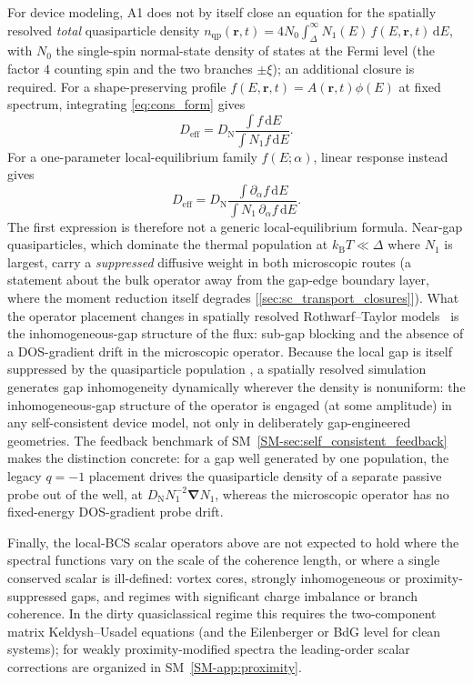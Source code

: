 \documentclass[
  aps,
  prb,
  preprint,
  superscriptaddress,
  longbibliography,
  nofootinbib
]{revtex4-2}
\newcommand{\dd}{\mathrm{d}}
\newcommand{\br}{\mathbf{r}}
\newcommand{\bnabla}{\boldsymbol{\nabla}}
\newcommand{\DOS}{N_1}
\newcommand{\DN}{D_{\mathrm{N}}}
\newcommand{\qp}{\mathrm{qp}}
\begin{document}
For device modeling, A1 does not by itself close an equation for the
spatially resolved \emph{total} quasiparticle density
\(n_{\qp}(\br,t)=4N_0\int_\Delta^\infty\DOS(E)\,f(E,\br,t)\,\dd E\), with \(N_0\)
the single-spin normal-state density of states at the Fermi level (the
factor \(4\) counting spin and the two branches \(\pm\xi\)); an
additional closure is required. For a shape-preserving profile
\(f(E,\br,t)=A(\br,t)\phi(E)\) at fixed spectrum, integrating
\cref{eq:cons_form} gives
\[
D_{\mathrm{eff}}
=\DN\frac{\int f\,\dd E}{\int\DOS f\,\dd E}.
\]
For a one-parameter local-equilibrium family \(f(E;\alpha)\), linear response
instead gives
\[
D_{\mathrm{eff}}
=\DN\frac{\int\partial_\alpha f\,\dd E}
          {\int\DOS\,\partial_\alpha f\,\dd E}.
\]
The first expression is therefore not a generic local-equilibrium formula.
Near-gap quasiparticles, which dominate the thermal population
at \(k_{\mathrm B}T\ll\Delta\) where \(\DOS\) is largest, carry a \emph{suppressed}
diffusive weight in both microscopic routes (a statement about the bulk
operator away from the gap-edge boundary layer, where the moment
reduction itself degrades [\cref{sec:sc_transport_closures}]). What the operator placement
changes in spatially
resolved Rothwarf--Taylor models~\cite{rothwarf1967} is the
inhomogeneous-gap structure of the flux: sub-gap blocking and the absence
of a DOS-gradient drift in the microscopic operator. Because the local gap is
itself suppressed by the quasiparticle population
\cite{owen1972,parker1975}, a spatially resolved simulation generates gap
inhomogeneity dynamically wherever the density is nonuniform: the
inhomogeneous-gap structure of the operator is engaged (at some
amplitude) in any self-consistent device model, not only in deliberately
gap-engineered geometries. The feedback benchmark of
SM~\cref{SM-sec:self_consistent_feedback} makes the distinction concrete: for
a gap well generated by one population, the legacy \(q=-1\) placement
drives the quasiparticle density of a separate passive probe out of the
well, at \(\DN\DOS^{-2}\bnabla\DOS\), whereas the microscopic operator
has no fixed-energy DOS-gradient probe drift.

Finally, the local-BCS scalar operators above are not expected to hold
where the spectral
functions vary on the scale of the coherence length, or where a single conserved
scalar is ill-defined: vortex cores, strongly inhomogeneous or
proximity-suppressed gaps, and regimes with significant charge imbalance or
branch coherence. In the dirty quasiclassical regime this requires the
two-component matrix Keldysh--Usadel equations (and the Eilenberger or BdG level
for clean systems); for weakly proximity-modified spectra the
leading-order scalar corrections are organized in
SM~\cref{SM-app:proximity}.
\end{document}
